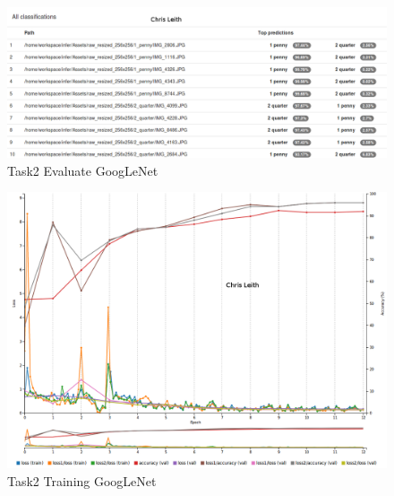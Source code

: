 \documentclass[10pt,journal,compsoc]{IEEEtran}
\begin{document}
\begin{figure}[h]
      \centering
      \includegraphics[width=\linewidth]{Assets/screenshots/Screenshot_2019-01-01_coins1_eval_google01.png}
      \caption{Task2 Evaluate GoogLeNet }
      \label{fig:Task2 Evaluate GoogLeNet}
\end{figure}


\begin{figure}[h]
      \centering
      \includegraphics[width=\linewidth]{Assets/screenshots/Screenshot_2019-01-01_coins1_train_google01.png}
      \caption{Task2 Training GoogLeNet }
      \label{fig:Task2 Training GoogLeNet}
\end{figure}
\end{document}
